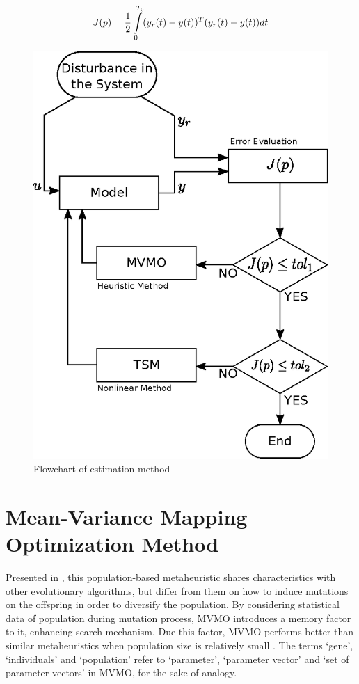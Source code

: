 \begin{equation}
	J(p) = \frac{1}{2}\int\displaylimits_{0}^{T_{0}}(y_{r}(t) - y(t))^{T}(y_{r}(t) - y(t))dt
	\label{eq: J(p)}
\end{equation}

\begin{figure}
	\caption{Flowchart of estimation method}
	\begin{center}
		\includegraphics[scale=0.7]{Images/Flowchart.eps}
	\end{center}
	\label{fig: flowchart}
\end{figure}

\section{Mean-Variance Mapping Optimization Method}

Presented in \cite{Erlich2010}, this population-based metaheuristic shares characteristics with other evolutionary algorithms, but differ from them on how to induce mutations on the offspring in order to diversify the population. By considering statistical data of population during mutation process, MVMO introduces a memory factor to it, enhancing search mechanism. Due this factor, MVMO performs better than similar metaheuristics when population size is relatively small \cite{Nakawiro2011}. The terms `gene', `individuals' and `population' refer to `parameter', `parameter vector' and `set of parameter vectors' in MVMO, for the sake of analogy.

